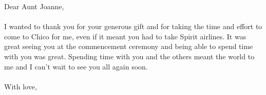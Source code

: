 \documentclass{letter}
\begin{document}
	Dear Aunt Joanne,\\\\
	
	I wanted to thank you for your generous gift and for taking the time and effort to come to Chico for me, even if it meant you had to take Spirit airlines. It was great seeing you at the commencement ceremony and being able to spend time with you was great. Spending time with you and the others meant the world to me and I can't wait to see you all again soon.\\\\
	
	With love,
\end{document}
